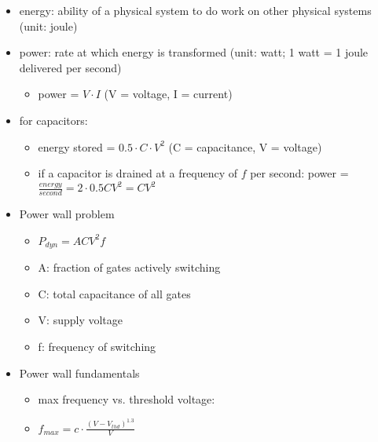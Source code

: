 \documentclass[12pt]{extarticle}
\begin{document}
    \begin{itemize}
        \item energy: ability of a physical system to do work on other physical systems (unit: joule)
        \item power: rate at which energy is transformed (unit: watt; 1 watt = 1 joule delivered per second)
        
        \begin{itemize}
            \item power = $V \cdot I$ (V = voltage, I = current)
        \end{itemize}
        
        \item for capacitors:
        
        \begin{itemize}
            \item energy stored = $0.5 \cdot C \cdot V^2$ (C = capacitance, V = voltage)
            \item if a capacitor is drained at a frequency of $f$ per second: 
            power = $\frac{energy}{second} = 2 \cdot 0.5 CV^2 = CV^2$
        \end{itemize}

        \item Power wall problem
        \begin{itemize}
            \item $P_{dyn} = ACV^2f$
            \item A: fraction of gates actively switching
            \item C: total capacitance of all gates
            \item V: supply voltage
            \item f: frequency of switching
        \end{itemize}

        \item Power wall fundamentals
        \begin{itemize}
            \item max frequency vs. threshold voltage:
            \item $f_{max} = c \cdot \frac{(V - V_{thd})^{1.3}}{V}$
        \end{itemize}


\end{itemize}
\end{document}
